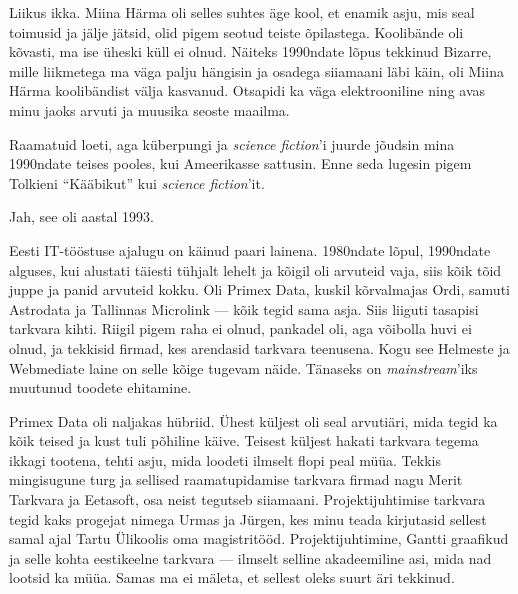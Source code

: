 
Liikus ikka. Miina Härma oli selles suhtes 
äge kool, et enamik asju, mis seal toimusid ja jälje jätsid, olid pigem 
seotud 
teiste õpilastega. Koolibände oli kõvasti, ma ise üheski küll ei olnud. 
Näiteks 1990ndate lõpus tekkinud Bizarre, mille liikmetega ma väga palju hängisin 
ja osadega 
siiamaani läbi käin, oli Miina Härma koolibändist välja kasvanud. Otsapidi ka väga elektrooniline ning avas minu jaoks arvuti 
ja muusika seoste maailma. 

Raamatuid loeti, aga küberpungi ja \emph{science fiction}'i 
juurde jõudsin mina 1990ndate teises pooles, kui Ameerikasse 
sattusin. Enne seda lugesin pigem Tolkieni \enquote{Kääbikut} kui 
\emph{science fiction}'it.


Jah, see oli aastal 1993.


Eesti IT-tööstuse ajalugu on käinud paari lainena. 
1980ndate lõpul, 1990ndate alguses, kui alustati 
täiesti tühjalt lehelt ja kõigil oli arvuteid vaja, siis kõik tõid juppe ja panid 
arvuteid kokku. Oli Primex Data, kuskil kõrvalmajas
Ordi, samuti Astrodata ja Tallinnas Microlink --- kõik tegid sama asja. Siis liiguti 
tasapisi tarkvara kihti. Riigil pigem raha ei olnud, pankadel oli, aga 
võibolla huvi ei olnud, ja tekkisid firmad, kes arendasid tarkvara teenusena. Kogu 
see Helmeste ja Webmediate laine on selle kõige tugevam näide. 
Tänaseks on \emph{mainstream}'iks muutunud toodete ehitamine. 

Primex Data oli naljakas hübriid. Ühest küljest oli seal arvutiäri, 
mida tegid ka kõik teised ja kust tuli põhiline käive. Teisest 
küljest hakati tarkvara tegema ikkagi tootena, tehti asju, mida loodeti ilmselt flopi peal müüa. Tekkis mingisugune turg ja sellised raamatupidamise tarkvara firmad nagu
Merit Tarkvara ja 
Eetasoft, 
osa neist tegutseb siiamaani. Projektijuhtimise tarkvara tegid kaks 
progejat nimega Urmas ja Jürgen, kes minu teada kirjutasid sellest samal ajal Tartu 
Ülikoolis oma magistritööd. Projektijuhtimine, Gantti graafikud ja selle kohta 
eestikeelne tarkvara --- ilmselt selline akadeemiline asi, mida nad 
lootsid ka müüa. Samas ma ei mäleta, et sellest oleks suurt äri 
tekkinud. 

